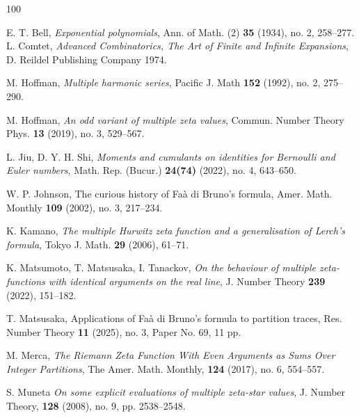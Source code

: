 \documentclass[12pt]{amsart}
\begin{document}
\begin{thebibliography}{100}





%
E. T. Bell, {\it Exponential polynomials}, Ann. of Math. (2) {\bf 35} (1934), no. 2, 258–277.
L. Comtet, {\it Advanced Combinatorics, The Art of Finite and Infinite Expansions}, D. Reildel Publishing Company 1974.

M. Hoffman, {\it Multiple harmonic series}, Pacific J. Math {\bf 152} (1992), no. 2, 275–290.

M. Hoffman, {\it An odd variant of multiple zeta values},
Commun. Number Theory Phys. {\bf 13} (2019), no. 3, 529–567.


L. Jiu, D. Y. H. Shi, 
{\it Moments and cumulants on identities for Bernoulli and Euler numbers}, 
Math. Rep. (Bucur.)  {\bf 24(74)} (2022), no. 4, 643–650.

W. P. Johnson,
The curious history of Fa\`a di Bruno's formula,
Amer. Math. Monthly {\bf 109} (2002), no. 3, 217--234.


K. Kamano, {\it The multiple Hurwitz zeta function and a generalisation of Lerch's formula}, Tokyo J. Math. {\bf 29} (2006), 61–71.




K. Matsumoto, T. Matsusaka, I. Tanackov,
{\it On the behaviour of multiple zeta-functions with identical arguments on the real line}, 
J. Number Theory {\bf 239} (2022), 151–182.

T. Matsusaka, 
Applications of Fa\`a di Bruno's formula to partition traces,
Res. Number Theory {\bf 11} (2025), no. 3, Paper No. 69, 11 pp.
 
M. Merca, {\it The Riemann Zeta Function With Even Arguments as Sums Over Integer Partitions}, The Amer. Math. Monthly, {\bf 124} (2017), no. 6, 554–557. 

S. Muneta
{\it On some explicit evaluations of multiple zeta-star values},
J. Number Theory, {\bf 128} (2008), no. 9, pp. 2538–2548.


\end{thebibliography}

 
\end{document}
